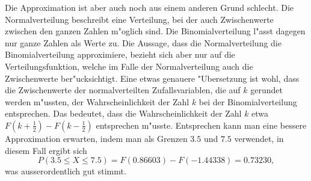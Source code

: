\begin{loesung}
\begin{teilaufgaben}
Die Approximation ist aber auch noch aus einem anderen Grund schlecht.
Die Normalverteilung beschreibt eine Verteilung, bei der auch Zwischenwerte
zwischen den ganzen Zahlen m"oglich sind. Die Binomialverteilung l"asst
dagegen nur ganze Zahlen als Werte zu. Die Aussage, dass die Normalverteilung
die Binomialverteilung approximiere, bezieht sich aber nur auf die
Verteilungsfunktion, welche im Falle der Normalverteilung auch die
Zwischenwerte ber"ucksichtigt. Eine etwas genauere "Ubersetzung
ist wohl, dass die Zwischenwerte der normalverteilten Zufallsvariablen,
die auf $k$ gerundet werden m"ussten, der Wahrscheinlichkeit der Zahl
$k$ bei der Binomialverteilung entsprechen. Das bedeutet, dass die
Wahrscheinlichkeit der Zahl $k$ etwa $F(k+\frac12)-F(k-\frac12)$
entsprechen m"usste.
Entsprechen kann man eine
bessere Approximation erwarten, indem man als Grenzen
$3.5$ und $7.5$ verwendet, in diesem Fall ergibt sich
\[
P(3.5\le X\le 7.5)=F(0.86603)-F(-1.44338)=0.73230,
\]
was ausserordentlich gut stimmt.
\qedhere
\end{teilaufgaben}
\end{loesung}

